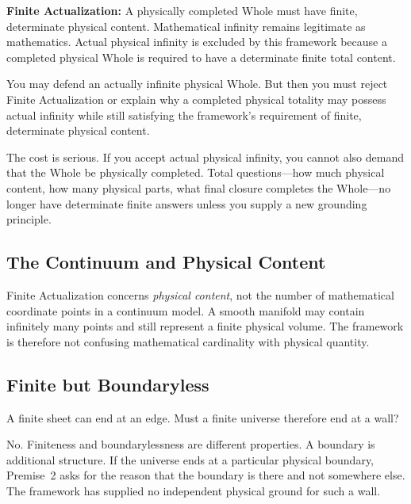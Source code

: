 \documentclass[11pt]{article}
\theoremstyle{canonstyle}
\begin{document}
\begin{keyresult}
\textbf{Finite Actualization:} A physically completed Whole must have finite, determinate physical content. Mathematical infinity remains legitimate as mathematics. Actual physical infinity is excluded by this framework because a completed physical Whole is required to have a determinate finite total content.
\end{keyresult}

\begin{ifyoudisagree}
You may defend an actually infinite physical Whole. But then you must reject Finite Actualization or explain why a completed physical totality may possess actual infinity while still satisfying the framework's requirement of finite, determinate physical content.

\medskip

The cost is serious. If you accept actual physical infinity, you cannot also demand that the Whole be physically completed. Total questions---how much physical content, how many physical parts, what final closure completes the Whole---no longer have determinate finite answers unless you supply a new grounding principle.
\end{ifyoudisagree}

\subsection{The Continuum and Physical Content}

Finite Actualization concerns \emph{physical content}, not the number of mathematical coordinate points in a continuum model. A smooth manifold may contain infinitely many points and still represent a finite physical volume. The framework is therefore not confusing mathematical cardinality with physical quantity.

\subsection{Finite but Boundaryless}

\begin{reflect}
A finite sheet can end at an edge. Must a finite universe therefore end at a wall?
\end{reflect}

No. Finiteness and boundarylessness are different properties. A boundary is additional structure. If the universe ends at a particular physical boundary, Premise~2 asks for the reason that the boundary is there and not somewhere else. The framework has supplied no independent physical ground for such a wall.
\end{document}
